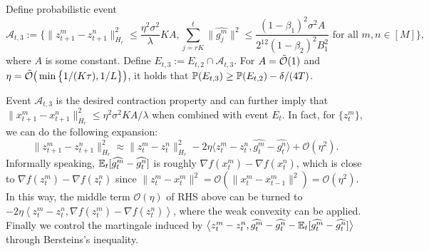 \documentclass{article} %
\numberwithin{equation}{section}
\begin{document}
    \begin{lemma}[Informal]\label{main:lem:contraction}
         Define probabilistic event
        \begin{equation}
            \mathcal{A}_{t,3}:=\Big\{ \|z_{t+1}^m-z_{t+1}^n\|_{H_r}^2 \leq \frac{\eta^2\sigma^2}{\lambda}KA, \sum_{j=rK}^{t}\|\widehat{g_j^m}\|^2\leq \frac{(1-\beta_1)^2\sigma^2A}{2^{12}(1-\beta_2)^2B_1^2} \text{ for all } m,n\in [M] \Big\},
        \end{equation}
        where $A$ is some constant.
        Define $E_{t,3} := E_{t,2} \cap \mathcal{A}_{t,3}$.
        For $A=\Tilde{\mathcal{O}}(1)$ and $\eta = \Tilde{\mathcal{O}}\big(\min\big\{1/(K\tau),1/L\big\}\big)$, it holds that $\mathbb{P}(E_{t,3})\geq \mathbb{P}(E_{t,2})-\delta/(4T)$.
    \end{lemma}
    Event $\mathcal{A}_{t,3}$ is the desired contraction property and can further imply that $\|x_{t+1}^m-x_{t+1}^n\|_{H_r}^2 \leq \eta^2\sigma^2KA/\lambda$ when combined with event $E_{t}$.
    In fact, for $\{z_t^m\}$, we can do the following expansion:
    \begin{equation}
        \|z_{t+1}^m-z_{t+1}^n\|_{H_r}^2 \approx \|z_t^m-z_t^n\|_{H_r}^2 -2\eta\langle z_t^m-z_t^n, \widehat{g_t^m}-\widehat{g_t^n}\rangle + \mathcal{O}(\eta^2).
    \end{equation}
    Informally speaking, $\mathbb{E}_t[\widehat{g_t^m}-\widehat{g_t^n}]$ is roughly $\nabla f(x_t^m)-\nabla f(x_t^n)$, which is close to $\nabla f(z_t^m)-\nabla f(z_t^n)$ since $\|z_t^m-x_t^m\|^2=\mathcal{O}(\|x_t^m-x_{t-1}^m\|^2)=\mathcal{O}(\eta^2)$. 
    In this way, the middle term $\mathcal{O}(\eta)$ of RHS above can be turned to $-2\eta\left\langle z_t^m-z_t^n, \nabla f(z_t^m)-\nabla f(z_t^n)\right\rangle$, where the weak convexity can be applied.
    Finally we control the martingale induced by $\big\langle z_t^m-z_t^n, \widehat{g_t^m}-\widehat{g_t^n}-\mathbb{E}_t[\widehat{g_t^m}-\widehat{g_t^n}]\big\rangle$ through Bersteins's inequality.
\end{document}
